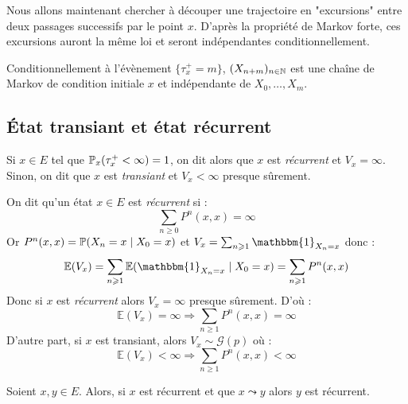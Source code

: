 Nous allons maintenant chercher à découper une trajectoire en "excursions" entre deux passages successifs par le point $x$. 
D'après la propriété de Markov forte, ces excursions auront la même loi et seront indépendantes conditionnellement. 

\begin{proposition}
    Conditionnellement à l'évènement $\{ \tau_x^+ = m\}$, $(X_{n +m})_{n \in \mathbb{N}}$ est une chaîne de Markov 
    de condition initiale $x$ et indépendante de $X_0, \dots, X_m$. 
\end{proposition}

\subsection{État transiant et état récurrent}

\begin{definition}
    Si $x \in E$ tel que $ \mathbb{P}_x( \tau_x^+ < \infty) = 1$, on dit alors que $x$ est \emph{récurrent} et 
    $V_x = \infty$. Sinon, on dit que $x$ est \emph{transiant} et $ V_x < \infty$ presque sûrement. 
\end{definition}

\begin{proposition}
    On dit qu'un état $x \in E$ est \emph{récurrent} si : 
        \[ \sum_{n \geqslant 0} P^n(x,x) = \infty \] 
    Or $ P^n(x,x) = \mathbb{P}(X_n = x \; | \; X_0 = x) $ et $ V_x = \sum_{n \geqslant 1} \mathbbm{1}_{X_n = x}$ donc : 
        \[ \mathbb{E}(V_x) = \sum_{n \geqslant 1} \mathbb{E}( \mathbbm{1}_{X_n = x} \; | \; X_0 = x ) = \sum_{n \geqslant 1} P^n(x,x)  \]   
    Donc si $x$ est \emph{récurrent} alors $V_x = \infty$ presque sûrement. D'où : 
        $$ \mathbb{E}(V_x)  = \infty \Longrightarrow \sum_{n \geqslant 1} P^n(x,x) = \infty $$ 
    D'autre part, si $x$ est transiant, alors $ V_x \sim \mathcal{G}(p)$ où : 
        \[ \mathbb{E}(V_x) < \infty \Longrightarrow  \sum_{n \geqslant 1} P^n(x,x) < \infty \]  
\end{proposition}

\begin{theorem}
    Soient $x,y \in E$. Alors, si $x$ est récurrent et que $ x \leadsto y$ alors $y$ est récurrent. 
\end{theorem}

